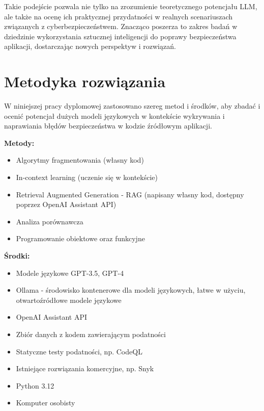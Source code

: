 Takie podejście pozwala nie tylko na zrozumienie teoretycznego potencjału LLM, ale także na ocenę ich praktycznej przydatności w realnych scenariuszach związanych z cyberbezpieczeństwem. Znacząco poszerza to zakres badań w dziedzinie wykorzystania sztucznej inteligencji do poprawy bezpieczeństwa aplikacji, dostarczając nowych perspektyw i rozwiązań.

\chapter{Metodyka rozwiązania}

W niniejszej pracy dyplomowej zastosowano szereg metod i środków, aby zbadać i ocenić potencjał dużych modeli językowych w kontekście wykrywania i naprawiania błędów bezpieczeństwa w kodzie źródłowym aplikacji.

\begin{multicols}{2}
\noindent
\textbf{Metody:}
\begin{itemize}
    \item Algorytmy fragmentowania (własny kod)
    \item In-context learning (uczenie się w kontekście)
    \item Retrieval Augmented Generation - RAG (napisany własny kod, dostępny poprzez OpenAI Assistant API)
    \item Analiza porównawcza
    \item Programowanie obiektowe oraz funkcyjne 
    \vfill\null
\end{itemize}

\columnbreak

\noindent
\textbf{Środki:}
\begin{itemize}
    \item Modele językowe GPT-3.5, GPT-4
    \item Ollama - środowisko kontenerowe dla modeli językowych, łatwe w użyciu, otwartoźródłowe modele językowe
    \item OpenAI Assistant API
    \item Zbiór danych z kodem zawierającym podatności
    \item Statyczne testy podatności, np. CodeQL
    \item Istniejące rozwiązania komercyjne, np. Snyk
    \item Python 3.12
    \item Komputer osobisty
\end{itemize}
\end{multicols}

